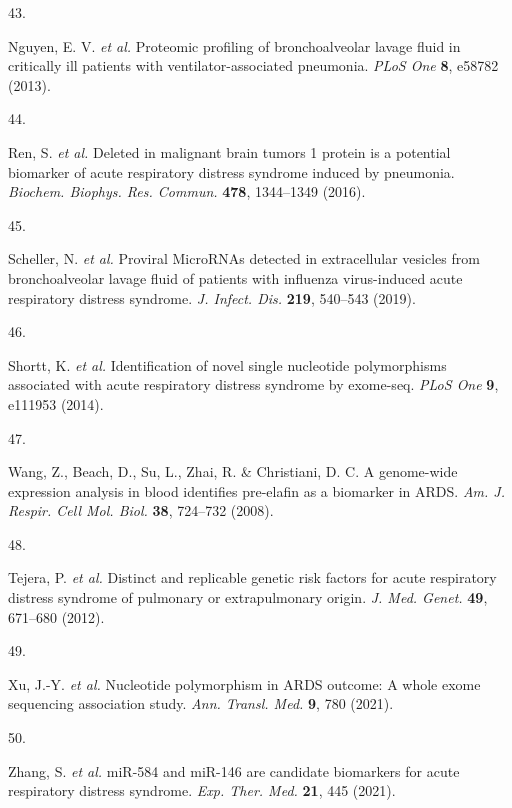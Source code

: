 \documentclass[
  11,
  a4paper,
]{article}
\newlength{\cslhangindent}
\newlength{\csllabelwidth}
\newlength{\cslentryspacingunit} %
\newenvironment{CSLReferences}[2] %
 {%
  \setlength{\parindent}{0pt}
  \ifodd #1
  \let\oldpar\par
  \def\par{\hangindent=\cslhangindent\oldpar}
  \fi
  \setlength{\parskip}{#2\cslentryspacingunit}
 }%
 {}
\newcommand{\CSLLeftMargin}[1]{\parbox[t]{\csllabelwidth}{#1}}
\newcommand{\CSLRightInline}[1]{\parbox[t]{\linewidth - \csllabelwidth}{#1}\break}
\begin{document}
\begin{CSLReferences}{0}{0}
\leavevmode{}%
\CSLLeftMargin{43. }%
\CSLRightInline{Nguyen, E. V. \emph{et al.} Proteomic profiling of
bronchoalveolar lavage fluid in critically ill patients with
ventilator-associated pneumonia. \emph{PLoS One} \textbf{8}, e58782
(2013).}

\leavevmode{}%
\CSLLeftMargin{44. }%
\CSLRightInline{Ren, S. \emph{et al.} Deleted in malignant brain tumors
1 protein is a potential biomarker of acute respiratory distress
syndrome induced by pneumonia. \emph{Biochem. Biophys. Res. Commun.}
\textbf{478}, 1344--1349 (2016).}

\leavevmode{}%
\CSLLeftMargin{45. }%
\CSLRightInline{Scheller, N. \emph{et al.} Proviral {MicroRNAs} detected
in extracellular vesicles from bronchoalveolar lavage fluid of patients
with influenza virus-induced acute respiratory distress syndrome.
\emph{J. Infect. Dis.} \textbf{219}, 540--543 (2019).}

\leavevmode{}%
\CSLLeftMargin{46. }%
\CSLRightInline{Shortt, K. \emph{et al.} Identification of novel single
nucleotide polymorphisms associated with acute respiratory distress
syndrome by exome-seq. \emph{PLoS One} \textbf{9}, e111953 (2014).}

\leavevmode{}%
\CSLLeftMargin{47. }%
\CSLRightInline{Wang, Z., Beach, D., Su, L., Zhai, R. \& Christiani, D.
C. A genome-wide expression analysis in blood identifies pre-elafin as a
biomarker in {ARDS}. \emph{Am. J. Respir. Cell Mol. Biol.} \textbf{38},
724--732 (2008).}

\leavevmode{}%
\CSLLeftMargin{48. }%
\CSLRightInline{Tejera, P. \emph{et al.} Distinct and replicable genetic
risk factors for acute respiratory distress syndrome of pulmonary or
extrapulmonary origin. \emph{J. Med. Genet.} \textbf{49}, 671--680
(2012).}

\leavevmode{}%
\CSLLeftMargin{49. }%
\CSLRightInline{Xu, J.-Y. \emph{et al.} Nucleotide polymorphism in
{ARDS} outcome: A whole exome sequencing association study. \emph{Ann.
Transl. Med.} \textbf{9}, 780 (2021).}

\leavevmode{}%
\CSLLeftMargin{50. }%
\CSLRightInline{Zhang, S. \emph{et al.} miR-584 and miR-146 are
candidate biomarkers for acute respiratory distress syndrome. \emph{Exp.
Ther. Med.} \textbf{21}, 445 (2021).}


\end{CSLReferences}
\end{document}
